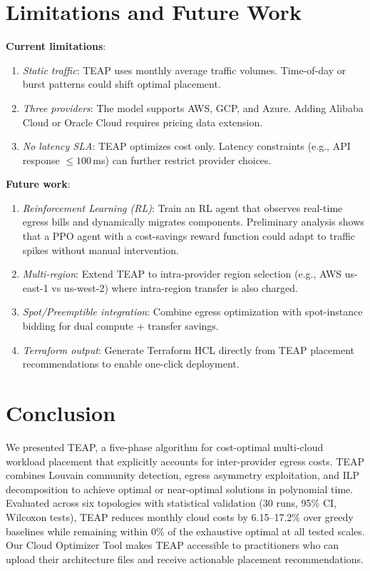 \documentclass[10pt,journal,compsoc]{IEEEtran}
\begin{document}
\section{Limitations and Future Work}
\label{sec:limits}

\textbf{Current limitations}:
\begin{enumerate}
  \item \emph{Static traffic}: TEAP uses monthly average traffic volumes.
        Time-of-day or burst patterns could shift optimal placement.
  \item \emph{Three providers}: The model supports AWS, GCP, and Azure.
        Adding Alibaba Cloud or Oracle Cloud requires pricing data extension.
  \item \emph{No latency SLA}: TEAP optimizes cost only.
        Latency constraints (e.g., API response $\leq 100$\,ms) can further
        restrict provider choices.
\end{enumerate}

\textbf{Future work}:
\begin{enumerate}
  \item \emph{Reinforcement Learning (RL)}: Train an RL agent that observes
        real-time egress bills and dynamically migrates components.
        Preliminary analysis shows that a PPO agent with a cost-savings reward
        function could adapt to traffic spikes without manual intervention.
  \item \emph{Multi-region}: Extend TEAP to intra-provider region selection
        (e.g., AWS us-east-1 vs us-west-2) where intra-region transfer is
        also charged.
  \item \emph{Spot/Preemptible integration}: Combine egress optimization with
        spot-instance bidding for dual compute + transfer savings.
  \item \emph{Terraform output}: Generate Terraform HCL directly from TEAP
        placement recommendations to enable one-click deployment.
\end{enumerate}

\section{Conclusion}

We presented TEAP, a five-phase algorithm for cost-optimal multi-cloud
workload placement that explicitly accounts for inter-provider egress costs.
TEAP combines Louvain community detection, egress asymmetry exploitation, and
ILP decomposition to achieve optimal or near-optimal solutions in polynomial
time.
Evaluated across six topologies with statistical validation (30 runs, 95\% CI,
Wilcoxon tests), TEAP reduces monthly cloud costs by 6.15–17.2\% over greedy
baselines while remaining within 0\% of the exhaustive optimal at all tested
scales.
Our Cloud Optimizer Tool makes TEAP accessible to practitioners who can upload
their architecture files and receive actionable placement recommendations.
\end{document}
